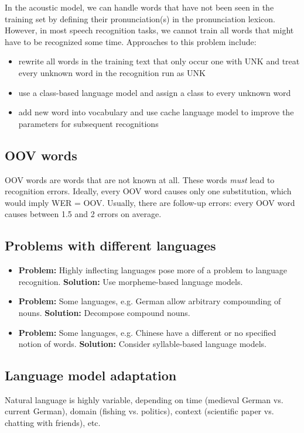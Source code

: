 \documentclass[11pt]{article}
\begin{document}
In the acoustic model, we can handle words that have not been seen in the training set by defining their pronunciation(s) in the pronunciation lexicon. However, in most speech recognition tasks, we cannot train all words that might have to be recognized some time. Approaches to this problem include:
\begin{itemize}
    \item rewrite all words in the training text that only occur one with UNK and treat every unknown word in the recognition run as UNK
    \item use a class-based language model and assign a class to every unknown word
    \item add new word into vocabulary and use cache language model to improve the parameters for subsequent recognitions
\end{itemize}

\subsection{OOV words}
OOV words are words that are not known at all. These words \textit{must} lead to recognition errors. Ideally, every OOV word causes only one substitution, which would imply WER = OOV. Usually, there are follow-up errors: every OOV word causes between 1.5 and 2 errors on average.

\subsection{Problems with different languages}
\begin{itemize}
    \item \textbf{Problem:} Highly inflecting languages pose more of a problem to language recognition. \textbf{Solution:} Use morpheme-based language models.
    \item \textbf{Problem:} Some languages, e.g. German allow arbitrary compounding of nouns. \textbf{Solution:} Decompose compound nouns.
    \item \textbf{Problem:} Some languages, e.g. Chinese have a different or no specified notion of words. \textbf{Solution:} Consider syllable-based language models.
\end{itemize}

\subsection{Language model adaptation}
Natural language is highly variable, depending on time (medieval German vs. current German), domain (fishing vs. politics), context (scientific paper vs. chatting with friends), etc.
\end{document}
